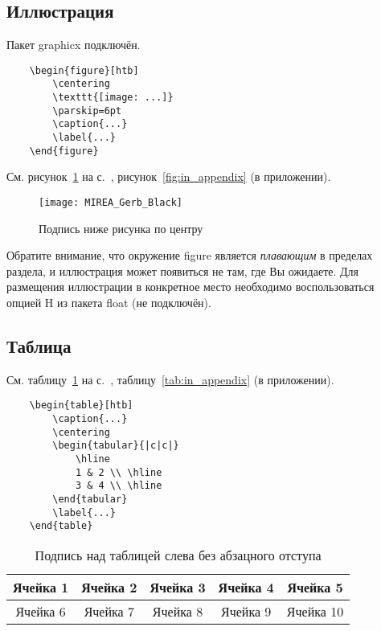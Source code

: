 \documentclass[14pt, a4paper, titlepage]{extarticle}
\begin{document}
\subsection{Иллюстрация}

Пакет graphicx подключён.

\begin{verbatim}
	\begin{figure}[htb]
		\centering
		\texttt{[image: ...]}
		\parskip=6pt
		\caption{...}
		\label{...}
	\end{figure}
\end{verbatim}

См. рисунок~\ref{fig:test_label} на с.~\pageref{fig:test_label}, рисунок~\ref{fig:in_appendix} (в приложении).

\begin{figure}[htb]
	\centering
	\texttt{[image: MIREA\_Gerb\_Black]}
	\parskip=6pt
	\caption{Подпись ниже рисунка по центру}
	\label{fig:test_label}
\end{figure}

Обратите внимание, что окружение figure является \emph{плавающим} в пределах раздела, и иллюстрация может появиться не там, где Вы ожидаете. Для размещения иллюстрации в конкретное место необходимо воспользоваться опцией H из пакета float (не подключён).

\subsection{Таблица}

См. таблицу~\ref{tab:test_label} на с.~\pageref{tab:test_label}, таблицу~\ref{tab:in_appendix} (в приложении).

\begin{verbatim}
	\begin{table}[htb]
		\caption{...}
		\centering
		\begin{tabular}{|c|c|} 
			\hline
			1 & 2 \\ \hline
			3 & 4 \\ \hline
		\end{tabular}
		\label{...}
	\end{table}
\end{verbatim}

\begin{table}[htb]
	\caption{Подпись над таблицей слева без абзацного отступа}
	\centering
	\begin{tabular}{ |c|c|c|c|c| } 
		\hline
		Ячейка 1 & Ячейка 2 & Ячейка 3 & Ячейка 4 & Ячейка 5 \\ \hline
		Ячейка 6 & Ячейка 7 & Ячейка 8 & Ячейка 9 & Ячейка 10 \\ \hline
	\end{tabular}
	\label{tab:test_label}
\end{table}
\end{document}
